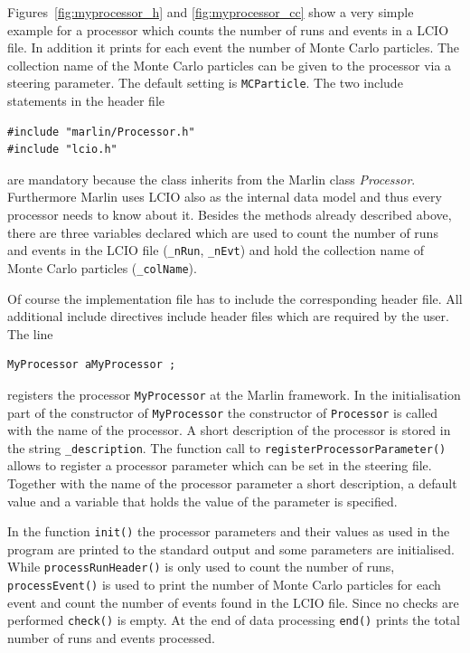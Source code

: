 Figures~\ref{fig:myprocessor_h} and \ref{fig:myprocessor_cc}
show a very simple example for a processor which counts the number of runs and
events in a LCIO file. In addition it prints for each event the number of 
Monte Carlo particles. The collection name of the Monte Carlo particles 
can be given to the processor via a steering parameter. The default setting is
{\tt MCParticle}. The two include statements in the header file

\begin{verbatim}
#include "marlin/Processor.h"
#include "lcio.h"
\end{verbatim}

are mandatory because the class inherits from the Marlin class
{\em Processor}. Furthermore Marlin uses LCIO also as the internal data model 
and thus every processor needs to know about it. 
Besides the methods already described above, there are three variables 
declared which are used to count the number of runs and events in the
LCIO file ({\tt \_nRun}, {\tt \_nEvt}) and hold the collection name of 
Monte Carlo particles ({\tt \_colName}). 

Of course the implementation file has to include the corresponding 
header file. All additional include directives include header files
which are required by the user. The line

\begin{verbatim}
MyProcessor aMyProcessor ;
\end{verbatim}

registers the processor {\tt MyProcessor} at the Marlin framework.
In the initialisation part of the constructor of 
{\tt MyProcessor} the constructor of {\tt Processor} is called with the
name of the processor. A short description of the processor is 
stored in the string {\tt \_description}. The function call to
{\tt registerProcessorParameter()} allows to register a processor parameter
which can be set in the steering file. Together with the name of the 
processor parameter a short description, a default value and a variable
that holds the value of the parameter is specified. 

In the function {\tt init()} the processor parameters and their 
values as used in the program are printed to the standard output and 
some parameters are initialised. While 
{\tt processRunHeader()} is only used to count the number of runs,
{\tt processEvent()} is used to print the number of Monte Carlo particles for 
each event and count the number of events found in the LCIO file.
Since no checks are performed {\tt check()} is empty.
At the end of data processing {\tt end()} prints the total number of 
runs and events processed. 

